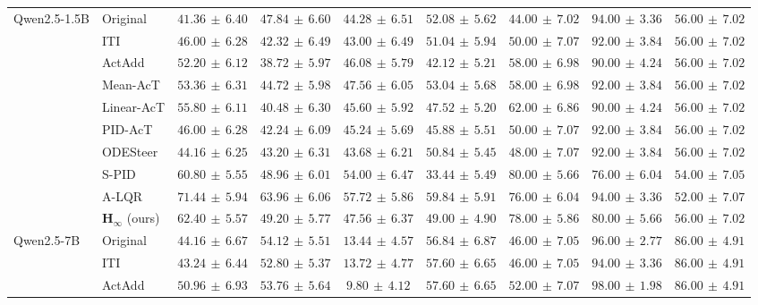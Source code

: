 \begin{table}[!htbp]
{\begin{tabular}{llcccc|ccc}
\midrule
\multirow{10}{*}{Qwen2.5-1.5B} & Original & $41.36\,\pm\,6.40$ & $47.84\,\pm\,6.60$ & $44.28\,\pm\,6.51$ & $52.08\,\pm\,5.62$ & $44.00\,\pm\,7.02$ & $94.00\,\pm\,3.36$ & $56.00\,\pm\,7.02$\\
 & ITI & $46.00\,\pm\,6.28$ & $42.32\,\pm\,6.49$ & $43.00\,\pm\,6.49$ & $51.04\,\pm\,5.94$ & $50.00\,\pm\,7.07$ & $92.00\,\pm\,3.84$ & $56.00\,\pm\,7.02$\\
 & ActAdd & $52.20\,\pm\,6.12$ & $38.72\,\pm\,5.97$ & $46.08\,\pm\,5.79$ & $42.12\,\pm\,5.21$ & $58.00\,\pm\,6.98$ & $90.00\,\pm\,4.24$ & $56.00\,\pm\,7.02$\\
 & Mean-AcT & $53.36\,\pm\,6.31$ & $44.72\,\pm\,5.98$ & $47.56\,\pm\,6.05$ & $53.04\,\pm\,5.68$ & $58.00\,\pm\,6.98$ & $92.00\,\pm\,3.84$ & $56.00\,\pm\,7.02$\\
 & Linear-AcT & $55.80\,\pm\,6.11$ & $40.48\,\pm\,6.30$ & $45.60\,\pm\,5.92$ & $47.52\,\pm\,5.20$ & $62.00\,\pm\,6.86$ & $90.00\,\pm\,4.24$ & $56.00\,\pm\,7.02$\\
 & PID-AcT & $46.00\,\pm\,6.28$ & $42.24\,\pm\,6.09$ & $45.24\,\pm\,5.69$ & $45.88\,\pm\,5.51$ & $50.00\,\pm\,7.07$ & $92.00\,\pm\,3.84$ & $56.00\,\pm\,7.02$\\
 & ODESteer & $44.16\,\pm\,6.25$ & $43.20\,\pm\,6.31$ & $43.68\,\pm\,6.21$ & $50.84\,\pm\,5.45$ & $48.00\,\pm\,7.07$ & $92.00\,\pm\,3.84$ & $56.00\,\pm\,7.02$\\
 & S-PID & $60.80\,\pm\,5.55$ & $48.96\,\pm\,6.01$ & $54.00\,\pm\,6.47$ & $33.44\,\pm\,5.49$ & $80.00\,\pm\,5.66$ & $76.00\,\pm\,6.04$ & $54.00\,\pm\,7.05$\\
 & A-LQR & $71.44\,\pm\,5.94$ & $63.96\,\pm\,6.06$ & $57.72\,\pm\,5.86$ & $59.84\,\pm\,5.91$ & $76.00\,\pm\,6.04$ & $94.00\,\pm\,3.36$ & $52.00\,\pm\,7.07$\\
 & $\boldsymbol{H_\infty}$ (ours) & $62.40\,\pm\,5.57$ & $49.20\,\pm\,5.77$ & $47.56\,\pm\,6.37$ & $49.00\,\pm\,4.90$ & $78.00\,\pm\,5.86$ & $80.00\,\pm\,5.66$ & $56.00\,\pm\,7.02$\\
\midrule
\multirow{10}{*}{Qwen2.5-7B} & Original & $44.16\,\pm\,6.67$ & $54.12\,\pm\,5.51$ & $13.44\,\pm\,4.57$ & $56.84\,\pm\,6.87$ & $46.00\,\pm\,7.05$ & $96.00\,\pm\,2.77$ & $86.00\,\pm\,4.91$\\
 & ITI & $43.24\,\pm\,6.44$ & $52.80\,\pm\,5.37$ & $13.72\,\pm\,4.77$ & $57.60\,\pm\,6.65$ & $46.00\,\pm\,7.05$ & $94.00\,\pm\,3.36$ & $86.00\,\pm\,4.91$\\
 & ActAdd & $50.96\,\pm\,6.93$ & $53.76\,\pm\,5.64$ & $9.80\,\pm\,4.12$ & $57.60\,\pm\,6.65$ & $52.00\,\pm\,7.07$ & $98.00\,\pm\,1.98$ & $86.00\,\pm\,4.91$\\

\end{tabular}}
\end{table}
